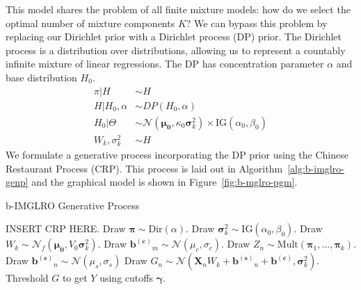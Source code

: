 \documentclass[10pt]{proc}
\newcommand*{\bias}[1]{ \bm{b^{(#1)}} }
\begin{document}
This model shares the problem of all finite mixture models: how do we select the
optimal number of mixture components $K$? We can bypass this problem by
replacing our Dirichlet prior with a Dirichlet process (DP) prior. The Dirichlet
process is a distribution over distributions, allowing us to represent a
countably infinite mixture of linear regressions. The DP has concentration
parameter $\alpha$ and base distribution $H_0$.
%
\begin{align}
    \pi | H &\sim H  \\
    H | H_0, \alpha &\sim DP(H_0, \alpha)  \\
    H_0 | \Theta &\sim \mathcal{N}\left(
        \bm{\mu_0}, \kappa_0 \bm{\sigma}_k^2
    \right) \times \text{IG}(\alpha_0, \beta_0) \\
    W_k, \sigma_k^2 &\sim H
\end{align}
%
We formulate a generative process incorporating the DP prior using the Chinese
Restaurant Process (CRP). This process is laid out in
Algorithm~\ref{alg:b-imglro-genp} and the graphical model is shown in
Figure~\ref{fig:b-mglro-pgm}.

\begin{algorithm}
    \caption{b-IMGLRO Generative Process}
    \label{alg:b-mglro-genp}
    \begin{algorithmic}[1]
        \State  INSERT CRP HERE.
        \State  Draw $\bm{\pi} \sim \text{Dir}(\alpha)$.
            \State  Draw $\bm{\sigma}_k^2 \sim \text{IG}(\alpha_0, \beta_0)$.
            \State  Draw $W_k \sim
                \mathcal{N}_f(\bm{\mu_0}, V_0 \bm{\sigma}_k^2)$.
        \EndFor
            \State  Draw $\bias{c}_m \sim
                \mathcal{N}(\mu_c, \sigma_c)$.
        \EndFor
            \State  Draw  $Z_n \sim \text{Mult}(\bm{\pi}_1, ..., \bm{\pi}_k)$.
            \State  Draw  $\bias{s}_n \sim \mathcal{N}(\mu_s, \sigma_s)$
            \State  Draw  $G_n \sim \mathcal{N}(
                    \bm{X}_n W_k + \bias{s}_n + \bias{c}, \bm{\sigma}_k^2)$.
        \EndFor
        \State  Threshold $G$ to get $Y$ using cutoffs $\bm{\gamma}$.
    \end{algorithmic}
\end{algorithm}
\end{document}
